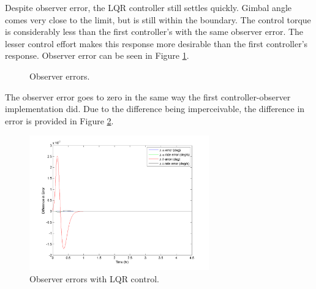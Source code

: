 \documentclass[]{aiaa-tc}%
\begin{document}
	Despite observer error, the LQR controller still settles quickly. Gimbal angle comes very close to the limit, but is still within the boundary. The control torque is considerably less than the first controller's with the same observer error. The lesser control effort makes this response more desirable than the first controller's response. Observer error can be seen in Figure \ref{fig:ControllerLQRObsErrors}.

	\begin{figure}[H]
		\centering
		\caption{Observer errors. }
		\label{fig:ControllerLQRObsErrors}
	\end{figure}	

	The observer error goes to zero in the same way the first controller-observer implementation did. Due to the difference being imperceivable, the difference in error is provided in Figure \ref{fig:DiffInError}.

	\begin{figure}[H]
		\centering
			\includegraphics[width = 7.75cm]{Ctrl1_LQR_error_diff_ObsErr.png}
		\caption{Observer errors with LQR control. }
		\label{fig:DiffInError}
	\end{figure}	
\end{document}
